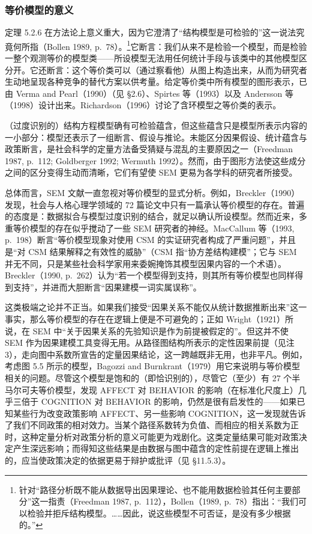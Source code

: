 \subsubsection*{等价模型的意义}

定理 5.2.6 在方法论上意义重大，因为它澄清了“结构模型是可检验的”这一说法究竟何所指（Bollen 1989, p.~78）。\footnote{针对“路径分析既不能从数据导出因果理论、也不能用数据检验其任何主要部分”这一指责（Freedman 1987, p.~112），Bollen（1989, p.~78）指出：“我们可以检验并拒斥结构模型。……因此，说这些模型不可否证，是没有多少根据的。”}它断言：我们从来不是检验一个模型，而是检验一整个观测等价的模型类——所设模型无法用任何统计手段与该类中的其他模型区分开。它还断言：这个等价类可以（通过察看他）从图上构造出来，从而为研究者生动地呈现各种竞争的替代方案以供考量。给定等价类中所有模型的图形表示，已由 Verma and Pearl（1990）（见 \S 2.6）、Spirtes 等（1993）以及 Andersson 等（1998）设计出来。Richardson（1996）讨论了含环模型之等价类的表示。

（过度识别的）结构方程模型确有可检验蕴含，但这些蕴含只是模型所表示内容的一小部分：模型还表示了一组断言、假设与推论。未能区分因果假设、统计蕴含与政策断言，是社会科学的定量方法备受猜疑与混乱的主要原因之一（Freedman 1987, p.~112; Goldberger 1992; Wermuth 1992）。然而，由于图形方法使这些成分之间的区分变得生动而清晰，它们有望使 SEM 更易为各学科的研究者所接受。

总体而言，SEM 文献一直忽视对等价模型的显式分析。例如，Breckler（1990）发现，社会与人格心理学领域的 72 篇论文中只有一篇承认等价模型的存在。普遍的态度是：数据拟合与模型过度识别的结合，就足以确认所设模型。然而近来，多重等价模型的存在似乎搅动了一些 SEM 研究者的神经。MacCallum 等（1993, p.~198）断言“等价模型现象对使用 CSM 的实证研究者构成了严重问题”，并且是“对 CSM 结果解释之有效性的威胁”（CSM 指“协方差结构建模”；它与 SEM 并无不同，只是某些社会科学家用来委婉掩饰其模型因果内容的一个术语）。Breckler（1990, p.~262）认为“若一个模型得到支持，则其所有等价模型也同样得到支持”，并进而大胆断言“因果建模一词实属误称”。

这类极端之论并不正当。如果我们接受“因果关系不能仅从统计数据推断出来”这一事实，那么等价模型的存在在逻辑上便是不可避免的；正如 Wright（1921）所说，在 SEM 中“关于因果关系的先验知识是作为前提被假定的”。但这并不使 SEM 作为因果建模工具变得无用。从路径图结构所表示的定性因果前提（见注 3），走向图中系数所宣告的定量因果结论，这一跨越既非无用，也非平凡。例如，考虑图 5.5 所示的模型，Bagozzi and Burnkrant（1979）用它来说明与等价模型相关的问题。尽管这个模型是饱和的（即恰识别的），尽管它（至少）有 27 个半马尔可夫等价模型，发现 AFFECT 对 BEHAVIOR 的影响（在标准化尺度上）几乎三倍于 COGNITION 对 BEHAVIOR 的影响，仍然是很有启发性的——如果已知某些行为改变政策影响 AFFECT、另一些影响 COGNITION，这一发现就告诉了我们不同政策的相对效力。当某个路径系数转为负值、而相应的相关系数为正时，这种定量分析对政策分析的意义可能更为戏剧化。这类定量结果可能对政策决定产生深远影响；而得知这些结果是由数据与图中蕴含的定性前提在逻辑上推出的，应当使政策决定的依据更易于辩护或批评（见 \S 11.5.3）。

